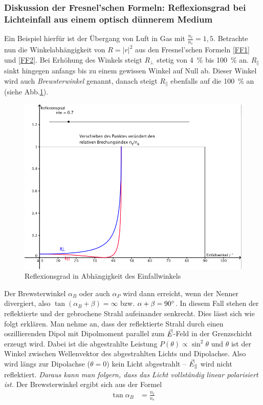 \subsubsection{Diskussion der Fresnel'schen Formeln: Reflexionsgrad bei Lichteinfall aus einem optisch dünnerem Medium}
Ein Beispiel hierfür ist der Übergang von Luft in Gas mit $\frac{n_t}{n_e}=1,5$.
Betrachte nun die Winkelabhängigkeit von $R=\vert r\vert^2$ aus den
Fresnel'schen Formeln \ref{FF1} und \ref{FF2}. 
Bei Erhöhung des Winkels steigt $R_{\bot}$ stetig von \SI{4}{\percent}
bis \SI{100}{\percent} an. 
$R_{\parallel}$ sinkt hingegen anfangs bis zu einem gewissen Winkel
auf Null ab. Dieser Winkel wird auch
\emph{Brewsterwinkel}%
%
genannt, danach steigt
$R_{\parallel}$ ebenfalls auf die \SI{100}{\percent} an (siehe
Abb.\ref{RefGrad}).
\begin{figure}
  \includegraphics[width=\linewidth]{Bilder/Reflexionsgrad}
  \caption{Reflexionsgrad in Abhängigkeit des Einfallwinkels\label{RefGrad}}
\end{figure}
Der Brewsterwinkel $\alpha_B$ oder auch $\alpha_P$ wird dann erreicht,
wenn der Nenner divergiert, also $\tan(\alpha_B+\beta)=\infty$
bzw. $\alpha+\beta=90\degree$. In diesem Fall stehen der reflektierte
und der gebrochene Strahl aufeinander senkrecht.
Dies lässt sich wie folgt erklären. Man nehme an, dass der
reflektierte Strahl durch einen oszillierenden Dipol mit Dipolmoment
parallel zum $\vec{E}$-Feld in der Grenzschicht erzeugt wird. Dabei ist
die abgestrahlte Leistung $P(\theta)\propto\sin^2\theta$ und $\theta$
ist der Winkel zwischen Wellenvektor des abgestrahlten Lichts und
Dipolachse. Also wird längs zur Dipolachse ($\theta=0$) kein Licht
abgestrahlt -- $\vec{E}_{\parallel}$ wird nicht reflektiert. 
\emph{Daraus kann man folgern, dass das Licht vollständig linear
  polarisiert ist.}
Der Brewsterwinkel ergibt sich aus der Formel
\begin{align*}
  \tan\alpha_B &= \frac{n_t}{n_e}
\end{align*}

